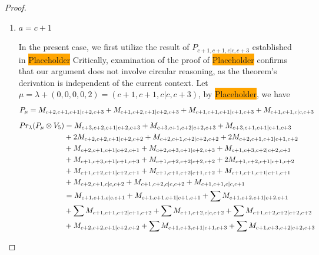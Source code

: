 \begin{proof}
\begin{enumerate}
\begin{enumerate}
      \item $a=c+1$ \par
        In the present case, we first utilize the result of $P_{c+1,c+1,c|c,c+3}$ established in \colorbox{orange}{Placeholder} Critically, examination of the proof of \colorbox{orange}{Placeholder} confirms that our argument does not involve circular reasoning, as the theorem's derivation is independent of the current context. Let $\mu = \lambda + (0,0,0,0,2) =(c+1,c+1,c|c,c+3) $, by \colorbox{orange}{Placeholder}, we have
        \begin{equation}\notag
          \begin{aligned}
            P_\mu = M_{c+2,c+1,c+1|c+2,c+3}
+M_{c+1,c+2,c+1|c+2,c+3}
+M_{c+1,c+1,c+1|c+1,c+3}
+M_{c+1,c+1,c|c,c+3}
          \end{aligned}
        \end{equation}
        \begin{equation}\notag
          \begin{aligned}
            Pr_{\lambda}(P_\mu \otimes V_{5}) &=
M_{c+3,c+2,c+1|c+2,c+3}
+ M_{c+3,c+1,c+2|c+2,c+3}
+ M_{c+3,c+1,c+1|c+1,c+3}\\
                                              &
+ 2M_{c+2,c+2,c+1|c+2,c+2}
+ M_{c+2,c+1,c+2|c+2,c+2}
+ 2M_{c+2,c+1,c+1|c+1,c+2}\\
                                              &
+ M_{c+2,c+1,c+1|c+2,c+1}
+ M_{c+2,c+3,c+1|c+2,c+3}
+ M_{c+1,c+3,c+2|c+2,c+3}\\
                                              &
+ M_{c+1,c+3,c+1|c+1,c+3}
+ M_{c+1,c+2,c+2|c+2,c+2}
+ 2M_{c+1,c+2,c+1|c+1,c+2}\\
                                              &
+ M_{c+1,c+2,c+1|c+2,c+1}
+ M_{c+1,c+1,c+2|c+1,c+2}
+ M_{c+1,c+1,c+1|c+1,c+1}\\
                                              &
+ M_{c+2,c+1,c|c,c+2}
+ M_{c+1,c+2,c|c,c+2}
+ M_{c+1,c+1,c|c,c+1} \\
                                               &=
 M_{c+1,c+1,c|c,c+1}
+  M_{c+1,c+1,c+1|c+1,c+1}
+ \sum M_{c+1,c+2,c+1|c+2,c+1}\\
                                              &
+ \sum M_{c+1,c+1,c+2|c+1,c+2}
+ \sum M_{c+1,c+2,c|c,c+2}
+ \sum M_{c+1,c+2,c+2|c+2,c+2}\\
                                              &
+  M_{c+2,c+2,c+1|c+2,c+2}
+ \sum M_{c+1,c+3,c+1|c+1,c+3}
+ \sum M_{c+1,c+3,c+2|c+2,c+3}
          \end{aligned}
        \end{equation}

\end{enumerate}
\end{enumerate}
\end{proof}
